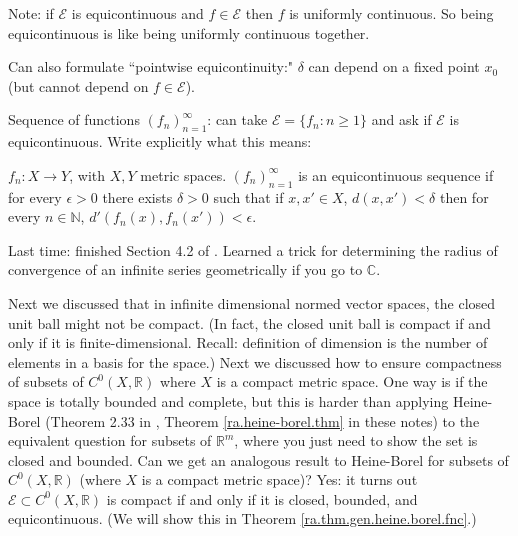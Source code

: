 Note: if \(\mathcal{E}\) is equicontinuous and \( f \in \mathcal{E}\) then \(f\) is uniformly continuous. So being equicontinuous is like being uniformly continuous together. 

Can also formulate ``pointwise equicontinuity:" \(\delta\) can depend on a fixed point \(x_0\) (but cannot depend on \(f \in \mathcal{E}\)).

Sequence of functions \((f_n)_{n=1}^\infty\): can take \(\mathcal{E} = \{f_n: n \geq 1 \}\) and ask if \(\mathcal{E}\) is equicontinuous. Write explicitly what this means:

\begin{definition}

 \(f_n: X \to Y\), with \(X, Y\) metric spaces. \((f_n)_{n=1}^\infty\) is an equicontinuous sequence if for every \(\epsilon > 0\) there exists \(\delta > 0\) such that if \(x, x' \in X\), \(d(x, x') < \delta\) then for every \(n \in \mathbb{N}\), \(d'(f_n(x), f_n(x')) < \epsilon\). 

\end{definition}

Last time: finished Section 4.2 of \citet{pugh2015real}. Learned a trick for determining the radius of convergence of an infinite series geometrically if you go to \(\mathbb{C}\). 

Next we discussed that in infinite dimensional normed vector spaces, the closed unit ball might not be compact. (In fact, the closed unit ball is compact if and only if it is finite-dimensional. Recall: definition of dimension is the number of elements in a basis for the space.) Next we discussed how to ensure compactness of subsets of \(C^0(X, \mathbb{R})\) where \(X\) is a compact metric space. One way is if the space is totally bounded and complete, but this is harder than applying Heine-Borel (Theorem 2.33 in \citet{pugh2015real}, Theorem \ref{ra.heine-borel.thm} in these notes) to the equivalent question for subsets of \(\mathbb{R}^m\), where you just need to show the set is closed and bounded. Can we get an analogous result to Heine-Borel for subsets of \(C^0(X, \mathbb{R})\) (where \(X\) is a compact metric space)? Yes: it turns out \(\mathcal{E} \subset C^0(X, \mathbb{R})\) is compact if and only if it is closed, bounded, and equicontinuous. (We will show this in Theorem \ref{ra.thm.gen.heine.borel.fnc}.)

